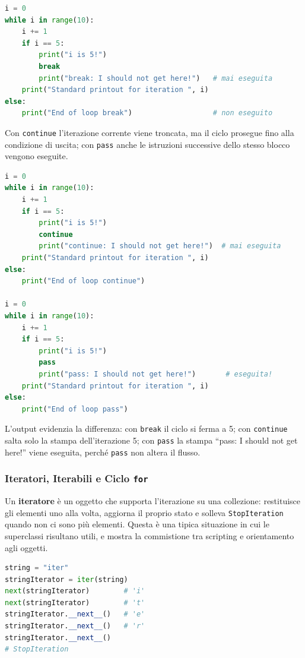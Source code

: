 \documentclass[12pt]{extarticle}
\begin{document}
\begin{lstlisting}[language=Python]
i = 0
while i in range(10):
    i += 1
    if i == 5:
        print("i is 5!")
        break
        print("break: I should not get here!")   # mai eseguita
    print("Standard printout for iteration ", i)
else:
    print("End of loop break")                   # non eseguito
\end{lstlisting}

\noindent Con \texttt{continue} l'iterazione corrente viene troncata, ma il ciclo prosegue fino alla condizione di uscita; con \texttt{pass} anche le istruzioni successive dello stesso blocco vengono eseguite.

\begin{lstlisting}[language=Python]
i = 0
while i in range(10):
    i += 1
    if i == 5:
        print("i is 5!")
        continue
        print("continue: I should not get here!")  # mai eseguita
    print("Standard printout for iteration ", i)
else:
    print("End of loop continue")

i = 0
while i in range(10):
    i += 1
    if i == 5:
        print("i is 5!")
        pass
        print("pass: I should not get here!")       # eseguita!
    print("Standard printout for iteration ", i)
else:
    print("End of loop pass")
\end{lstlisting}

\noindent L'output evidenzia la differenza: con \texttt{break} il ciclo si ferma a 5; con \texttt{continue} salta solo la stampa dell'iterazione 5; con \texttt{pass} la stampa ``pass: I should not get here!'' viene eseguita, perché \texttt{pass} non altera il flusso.

\subsubsection{Iteratori, Iterabili e Ciclo \texttt{for}}

\noindent Un \textbf{iteratore} è un oggetto che supporta l'iterazione su una collezione: restituisce gli elementi uno alla volta, aggiorna il proprio stato e solleva \texttt{StopIteration} quando non ci sono più elementi. Questa è una tipica situazione in cui le superclassi risultano utili, e mostra la commistione tra scripting e orientamento agli oggetti.

\begin{lstlisting}[language=Python]
string = "iter"
stringIterator = iter(string)
next(stringIterator)        # 'i'
next(stringIterator)        # 't'
stringIterator.__next__()   # 'e'
stringIterator.__next__()   # 'r'
stringIterator.__next__()
# StopIteration
\end{lstlisting}
\end{document}
